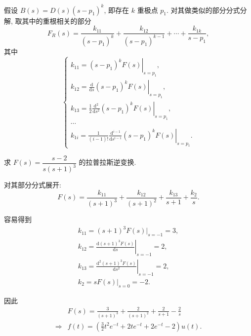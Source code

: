假设 $B(s)=D(s)(s-p_1)^k$, 即存在 $k$ 重极点 $p_1$. 对其做类似的部分分式分解, 取其中的重根相关的部分
\begin{equation}
    F_R(s)=\frac{k_{11}}{(s-p_1)^k}+\frac{k_{12}}{(s-p_1)^{k-1}}+\cdots+\frac{k_{1k}}{s-p_1},
\end{equation}
其中
\begin{equation}
    \begin{cases}
        k_{11}=\left.(s-p_1)^kF(s)\right|_{s=p_1},                                              \\
        k_{12}=\left.\frac{\mathrm{d}}{\mathrm{d}s}(s-p_1)^kF(s)\right|_{s=p_1},                \\
        k_{13}=\left.\frac{1}{2}\frac{\mathrm{d}^2}{\mathrm{d}s^2}(s-p_1)^kF(s)\right|_{s=p_1}, \\
        \cdots                                                                                  \\
        k_{1i}=\left.\frac{1}{(i-1)!}\frac{\mathrm{d}^{i-1}}{\mathrm{d}s^{i-1}}(s-p_1)^kF(s)\right|_{s=p_1}.
    \end{cases}
\end{equation}

\begin{exampleprob}
    求 $F(s)=\dfrac{s-2}{s(s+1)^3}$ 的拉普拉斯逆变换.

    \begin{solution}
        对其部分分式展开:
        \begin{equation*}
            F(s)=\frac{k_{11}}{(s+1)^3}+\frac{k_{12}}{(s+1)^2}+\frac{k_{13}}{s+1}+\frac{k_2}{s}.
        \end{equation*}

        容易得到
        \begin{gather*}
            k_{11}=(s+1)^3F(s)|_{s=-1}=3, \\
            k_{12}=\left.\frac{\mathrm{d}(s+1)^3F(s)}{\mathrm{d}s}\right|_{s=-1}=2, \\
            k_{13}=\left.\frac{\mathrm{d}^2(s+1)^3F(s)}{\mathrm{d}s^2}\right|_{s=-1}=2, \\
            k_2=sF(s)|_{s=0}=-2.
        \end{gather*}

        因此
        \begin{align*}
                        & F(s)=\frac{3}{(s+1)^3}+\frac{2}{(s+1)^2}+\frac{2}{s+1}-\frac{2}{s} \\
            \Rightarrow & f(t)=\left(\frac{3}{2}t^2e^{-t}+2te^{-t}+2e^{-t}-2\right)u(t).
        \end{align*}
    \end{solution}
\end{exampleprob}
